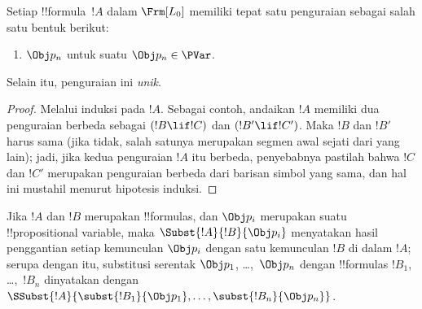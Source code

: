 \documentclass[../../../include/open-logic-section]{subfiles}
\begin{document}
\begin{prop}
Setiap !!{formula}~$!A$ dalam $ \Frm[L_0]$ memiliki tepat satu penguraian
sebagai salah satu bentuk berikut:
\begin{enumerate}


\item $\Obj p_n$ untuk suatu $\Obj p_n \in  \PVar$.
  




\end{enumerate}
Selain itu, penguraian ini \emph{unik}.
\end{prop}

\begin{proof}
Melalui induksi pada $!A$. Sebagai contoh, andaikan $!A$ memiliki dua
penguraian berbeda sebagai $(!B \lif !C)$ dan $(!B' \lif !C')$. Maka $!B$
dan $!B'$ harus sama (jika tidak, salah satunya merupakan segmen awal sejati
dari yang lain); jadi, jika kedua penguraian $!A$ itu berbeda, penyebabnya
pastilah bahwa $!C$ dan $!C'$ merupakan penguraian berbeda dari barisan
simbol yang sama, dan hal ini mustahil menurut hipotesis induksi.
\end{proof}


\begin{defn}
Jika $!A$ dan $!B$ merupakan !!{formula}s, dan $\Obj p_i$ merupakan suatu
!!{propositional
variable}, maka $\Subst{!A}{!B}{\Obj p_i}$ menyatakan hasil
penggantian setiap kemunculan $\Obj p_i$ dengan satu kemunculan $!B$ di
dalam $!A$; serupa dengan itu, substitusi serentak $\Obj p_1$, \dots,~$\Obj p_n$
dengan !!{formula}s $!B_1$, \dots,~$!B_n$ dinyatakan dengan
$\SSubst{!A}{\subst{!B_1}{\Obj p_1},\dots,\subst{!B_n}{\Obj p_n}}$.
\end{defn}
\end{document}
